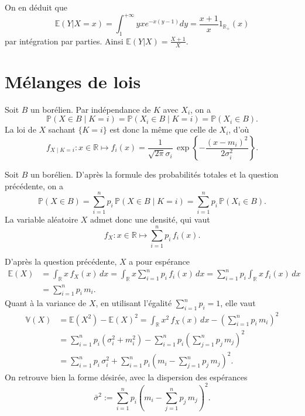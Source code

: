 \label{III-answer-ex1-3}
On en déduit que
\[\mathbb{E}(Y|X=x ) = \int_1^{+\infty} y x e^{-x(y-1)} dy = \frac{x+1}{x}1_{\mathbb{R}_+}(x)\]
par intégration par parties. Ainsi \(\mathbb{E}(Y|X) = \frac{X+1}{X}\).

\section{Mélanges de lois}\label{III-muxe9langes-de-lois-1}

\label{III-answer-melloi1}
Soit \(B\) un borélien. Par indépendance de \(K\) avec \(X_i\), on a
\[\mathbb{P}(X \in B \mid K = i) = \mathbb{P}(X_i \in B \mid K = i) = \mathbb{P}(X_i \in B).\]
La loi de \(X\) sachant \(\{K = i\}\) est donc la même que celle de
\(X_i\), d'où
\[f_{X\mid K = i} : x\in\mathbb{R}\mapsto f_i(x) = \dfrac{1}{\sqrt{2\pi}\sigma_i}\,\exp\left\{- \dfrac{(x-m_i)^2}{2\sigma_i^2} \right\}.\]

\label{III-answer-melloi2}
Soit \(B\) un borélien. D'après la formule des probabilités totales et
la question précédente, on a
\[\mathbb{P}(X\in B) = \sum_{i = 1}^n p_i\,\mathbb{P}(X \in B \mid K = i) = \sum_{i = 1}^n p_i\,\mathbb{P}(X_i \in B).\]
La variable aléatoire \(X\) admet donc une densité, qui vaut
\[f_X : x\in\mathbb{R}\mapsto \sum_{i = 1}^n p_i\,f_i(x).\]

\label{III-answer-melloi3}
D'après la question précédente, \(X\) a pour espérance \begin{align*}
\mathbb{E}(X) &= \int_\mathbb{R}x\,f_X(x)\,dx = \int_\mathbb{R}x \sum_{i = 1}^n p_i\, f_i(x)\,dx =  \sum_{i = 1}^n p_i \int_\mathbb{R}x\,f_i(x)\,dx\\
& = \sum_{i = 1}^n p_i\,m_i.
\end{align*} Quant à la variance de \(X\), en utilisant l'égalité
\(\sum_{i= 1}^n p_i = 1\), elle vaut \begin{align*}
\mathbb{V}(X) &= \mathbb{E}\left(X^2\right) - \mathbb{E}(X)^2 = \int_\mathbb{R}x^2\,f_X(x)\,dx - \left(\sum_{i = 1}^n p_i\,m_i\right)^2\\
&= \sum_{i = 1}^n p_i (\sigma_i^2 + m_i^2) - \sum_{i = 1}^n p_i\left(\sum_{j = 1}^n p_j\,m_j\right)^2\\
&= \sum_{i = 1}^n p_i\,\sigma_i^2 + \sum_{i = 1}^n p_i \left(m_i - \sum_{j=1}^n p_j\,m_j \right)^2.
\end{align*} On retrouve bien la forme désirée, avec la dispersion des
espérances
\[\bar{\sigma}^2 := \sum_{i = 1}^n p_i \left(m_i - \sum_{j=1}^n p_j\,m_j \right)^2.\]

